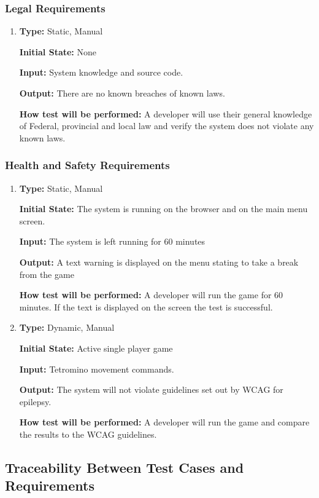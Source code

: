 \documentclass[12pt, titlepage]{article}
\begin{document}
	\subsubsection{Legal Requirements}
	\begin{enumerate}[{NFR-LR}1. ]
		\item
		\textbf{Type:} Static, Manual
		
		\textbf{Initial State:} None
		
		\textbf{Input:} System knowledge and source code.
		
		\textbf{Output:} There are no known breaches of known laws.
		
		\textbf{How test will be performed:} A developer will use their general knowledge of Federal, provincial and local law and verify the system does not violate any known laws.
		
		
	\end{enumerate}
	\subsubsection{Health and Safety Requirements}
	\begin{enumerate}[{HSR}1. ]
		\item
		\textbf{Type:} Static, Manual
		
		\textbf{Initial State:} The system is running on the browser and on the main menu screen.
		
		\textbf{Input:} The system is left running for 60 minutes
		
		\textbf{Output:} A text warning is displayed on the menu stating to take a break from the game
		
		\textbf{How test will be performed:} A developer will run the game for 60 minutes. If the text is displayed on the screen the test is successful. 
		
		\item
		\textbf{Type:} Dynamic, Manual
		
		\textbf{Initial State:} Active single player game
		
		\textbf{Input:} Tetromino movement commands.
		
		\textbf{Output:} The system will not violate guidelines set out by WCAG for epilepsy. 
		
		\textbf{How test will be performed:} A developer will run the game and compare the results to the WCAG guidelines. 
	\end{enumerate}
	
	\subsection{Traceability Between Test Cases and Requirements}
	
\end{document}
